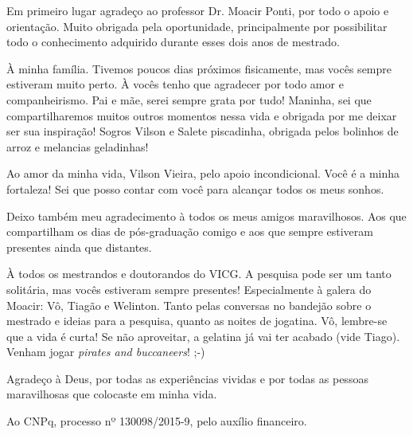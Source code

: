 
Em primeiro lugar agradeço ao professor Dr. Moacir Ponti, por todo o apoio e orientação. Muito obrigada pela oportunidade, principalmente por possibilitar todo o conhecimento adquirido durante esses dois anos de mestrado.

À minha família. Tivemos poucos dias próximos fisicamente, mas vocês sempre estiveram muito perto. À vocês tenho que agradecer por todo amor e companheirismo. Pai e mãe, serei sempre grata por tudo! Maninha, sei que compartilharemos muitos outros momentos nessa vida e obrigada por me deixar ser sua inspiração! Sogros Vilson e Salete piscadinha, obrigada pelos bolinhos de arroz e melancias geladinhas!

Ao amor da minha vida, Vilson Vieira, pelo apoio incondicional. Você é a minha fortaleza! Sei que posso contar com você para alcançar todos os meus sonhos.

Deixo também meu agradecimento à todos os meus amigos maravilhosos. Aos que compartilham os dias de pós-graduação comigo e aos que sempre estiveram presentes ainda que distantes.

À todos os mestrandos e doutorandos do VICG. A pesquisa pode ser um tanto solitária, mas vocês estiveram sempre presentes! Especialmente à galera do Moacir: Vô, Tiagão e Welinton. Tanto pelas conversas no bandejão sobre o mestrado e ideias para a pesquisa, quanto as noites de jogatina. Vô, lembre-se que a vida é curta! Se não aproveitar, a gelatina já vai ter acabado (vide Tiago). Venham jogar \textit{pirates and buccaneers}! ;-)

Agradeço à Deus, por todas as experiências vividas e por todas as pessoas maravilhosas que colocaste em minha vida.

Ao CNPq, processo nº 130098/2015-9, pelo auxílio financeiro.

